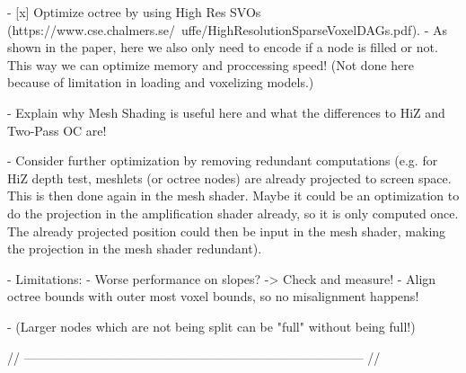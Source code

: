 - [x] Optimize octree by using High Res SVOs (https://www.cse.chalmers.se/~uffe/HighResolutionSparseVoxelDAGs.pdf).
    - As shown in the paper, here we also only need to encode if a node is filled or not. This way we can 
    optimize memory and proccessing speed! (Not done here because of limitation in loading and voxelizing models.)

- Explain why Mesh Shading is useful here and what the differences to HiZ and Two-Pass OC are!

- Consider further optimization by removing redundant computations (e.g. for HiZ depth test, meshlets (or octree nodes)
are already projected to screen space. This is then done again in the mesh shader. Maybe it could be an optimization 
to do the projection in the amplification shader already, so it is only computed once. The already projected position 
could then be input in the mesh shader, making the projection in the mesh shader redundant).

- Limitations: 
    - Worse performance on slopes? -> Check and measure!
    - Align octree bounds with outer most voxel bounds, so no misalignment happens!

    - (Larger nodes which are not being split can be "full" without being full!)

// --------------------------------------------------------------------------------- //
